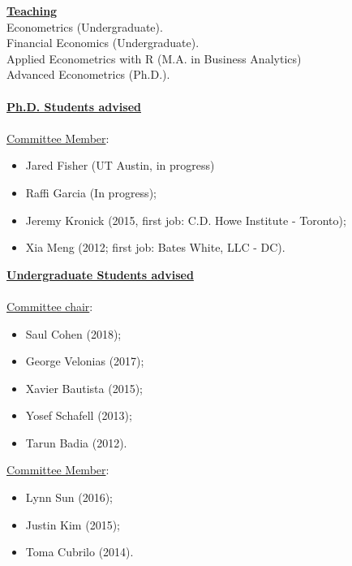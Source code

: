 \documentclass[12pt]{article}
\begin{document}

\underline{\textbf{Teaching}}\\
Econometrics (Undergraduate).\\
Financial Economics (Undergraduate). \\
Applied Econometrics with R (M.A. in Business Analytics) \\
Advanced Econometrics (Ph.D.). \\ \\
\underline{\textbf{Ph.D. Students advised}} \\ \\
\underline{Committee Member}: 
\begin{itemize}
	\item Jared Fisher (UT Austin, in progress) 
	\item Raffi Garcia  (In progress);
	\item Jeremy Kronick (2015, first job: C.D. Howe Institute - Toronto);
	\item Xia Meng (2012; first job: Bates White, LLC - DC). 
\end{itemize}
\underline{\textbf{Undergraduate Students advised}} \\ \\
\underline{Committee chair}: 
\begin{itemize}
	\item Saul Cohen (2018);
	\item George Velonias (2017);
	\item Xavier Bautista (2015);
	\item Yosef Schafell (2013);
	\item Tarun Badia (2012). 
\end{itemize}
\underline{Committee Member}: 
\begin{itemize}
	\item Lynn Sun (2016);
	\item Justin Kim (2015);
	\item Toma Cubrilo (2014).
\end{itemize}
\end{document}
